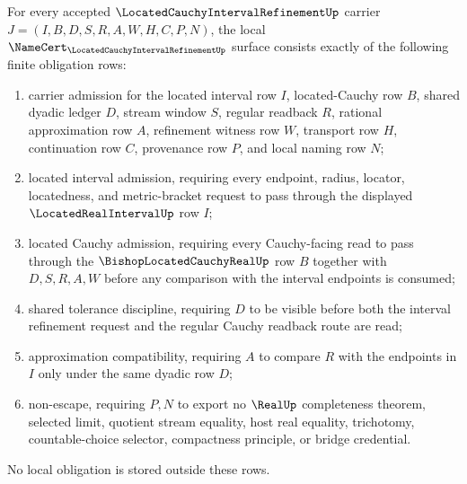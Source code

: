 \begin{theorem}
\label{thm:located-cauchy-interval-refinement-namecert-obligations}
For every accepted $\LocatedCauchyIntervalRefinementUp$ carrier $J=(I,B,D,S,R,A,W,H,C,P,N)$, the local $\NameCert_{\LocatedCauchyIntervalRefinementUp}$ surface consists exactly of the following finite obligation rows:
\begin{enumerate}
\item carrier admission for the located interval row $I$, located-Cauchy row $B$, shared dyadic ledger $D$, stream window $S$, regular readback $R$, rational approximation row $A$, refinement witness row $W$, transport row $H$, continuation row $C$, provenance row $P$, and local naming row $N$;
\item located interval admission, requiring every endpoint, radius, locator, locatedness, and metric-bracket request to pass through the displayed $\LocatedRealIntervalUp$ row $I$;
\item located Cauchy admission, requiring every Cauchy-facing read to pass through the $\BishopLocatedCauchyRealUp$ row $B$ together with $D,S,R,A,W$ before any comparison with the interval endpoints is consumed;
\item shared tolerance discipline, requiring $D$ to be visible before both the interval refinement request and the regular Cauchy readback route are read;
\item approximation compatibility, requiring $A$ to compare $R$ with the endpoints in $I$ only under the same dyadic row $D$;
\item non-escape, requiring $P,N$ to export no $\RealUp$ completeness theorem, selected limit, quotient stream equality, host real equality, trichotomy, countable-choice selector, compactness principle, or bridge credential.
\end{enumerate}
No local obligation is stored outside these rows.
\end{theorem}
